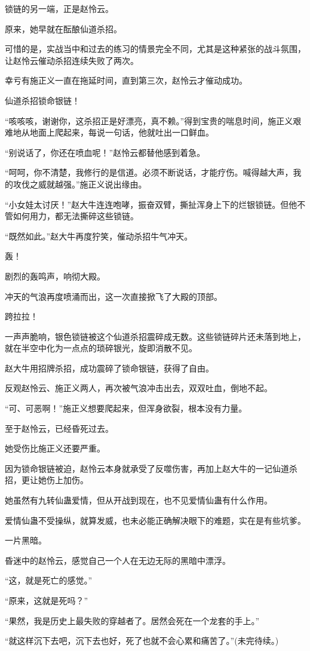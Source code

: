 \begin{this_body}
锁链的另一端，正是赵怜云。

原来，她早就在酝酿仙道杀招。

可惜的是，实战当中和过去的练习的情景完全不同，尤其是这种紧张的战斗氛围，让赵怜云催动杀招连续失败了两次。

幸亏有施正义一直在拖延时间，直到第三次，赵怜云才催动成功。

仙道杀招锁命银链！

“咳咳咳，谢谢你，这杀招正是好漂亮，真不赖。”得到宝贵的喘息时间，施正义艰难地从地面上爬起来，每说一句话，他就吐出一口鲜血。

“别说话了，你还在喷血呢！”赵怜云都替他感到着急。

“呵呵，你不清楚，我修行的是信道。必须不断说话，才能疗伤。喊得越大声，我的攻伐之威就越强。”施正义说出缘由。

“小女娃太讨厌！”赵大牛连连咆哮，振奋双臂，撕扯浑身上下的烂银锁链。但他不管如何用力，都无法撕碎这些锁链。

“既然如此。”赵大牛再度狞笑，催动杀招牛气冲天。

轰！

剧烈的轰鸣声，响彻大殿。

冲天的气浪再度喷涌而出，这一次直接掀飞了大殿的顶部。

跨拉拉！

一声声脆响，银色锁链被这个仙道杀招震碎成无数。这些锁链碎片还未落到地上，就在半空中化为一点点的琐碎银光，旋即消散不见。

赵大牛用招牌杀招，成功震碎了锁命银链，获得了自由。

反观赵怜云、施正义两人，再次被气浪冲击出去，双双吐血，倒地不起。

“可、可恶啊！”施正义想要爬起来，但浑身欲裂，根本没有力量。

至于赵怜云，已经昏死过去。

她受伤比施正义还要严重。

因为锁命银链被迫，赵怜云本身就承受了反噬伤害，再加上赵大牛的一记仙道杀招，更让她伤上加伤。

她虽然有九转仙蛊爱情，但从开战到现在，也不见爱情仙蛊有什么作用。

爱情仙蛊不受操纵，就算发威，也未必能正确解决眼下的难题，实在是有些坑爹。

一片黑暗。

昏迷中的赵怜云，感觉自己一个人在无边无际的黑暗中漂浮。

“这，就是死亡的感觉。”

“原来，这就是死吗？”

“果然，我是历史上最失败的穿越者了。居然会死在一个龙套的手上。”

“就这样沉下去吧，沉下去也好，死了也就不会心累和痛苦了。”(未完待续。)

\end{this_body}

